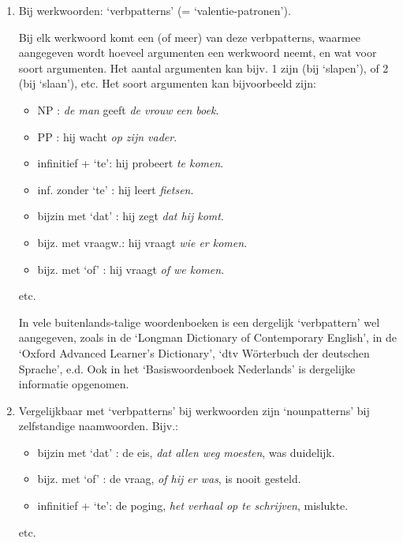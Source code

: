 \begin{enumerate}
   \item Bij werkwoorden: `verbpatterns' (= `valentie-patronen').

   Bij elk werkwoord komt een (of meer) van deze verbpatterns, waarmee 
   aangegeven wordt hoeveel argumenten een werkwoord neemt, en wat voor soort
   argumenten. 
   Het aantal argumenten kan bijv. 1 zijn (bij `slapen'), of 2 (bij `slaan'),
   etc. 
   Het soort argumenten kan bijvoorbeeld zijn:

   \begin{itemize}
      \item NP               : {\em de man} geeft {\em de vrouw} {\em een boek}.
      \item PP               : hij wacht {\em op zijn vader}.
      \item infinitief + `te': hij probeert {\em te komen}.
      \item inf. zonder `te' : hij leert {\em fietsen}.
      \item bijzin met `dat' : hij zegt {\em dat hij komt}.
      \item bijz. met vraagw.: hij vraagt {\em wie er komen}.
      \item bijz. met `of'   : hij vraagt {\em of we komen}.
   \end{itemize}

etc.

  In vele buitenlands-talige woordenboeken is een dergelijk `verbpattern' wel
aangegeven, zoals in de `Longman Dictionary of Contemporary English', in de
`Oxford Advanced Learner's Dictionary', `dtv W\"{o}rterbuch der deutschen 
Sprache', e.d. Ook in het `Basiswoordenboek Nederlands' is dergelijke 
informatie opgenomen. 
 
  \item Vergelijkbaar met `verbpatterns' bij werkwoorden zijn `nounpatterns' bij 
   zelfstandige naamwoorden. Bijv.: 

  \begin{itemize}
    \item bijzin met `dat' : de eis, {\em dat allen weg moesten}, was duidelijk.
    \item bijz. met `of'   : de vraag, {\em of hij er was}, is nooit gesteld.
    \item infinitief + `te': de poging, {\em het verhaal op te schrijven}, mislukte.
  \end{itemize}
  
etc.


\end{enumerate}
